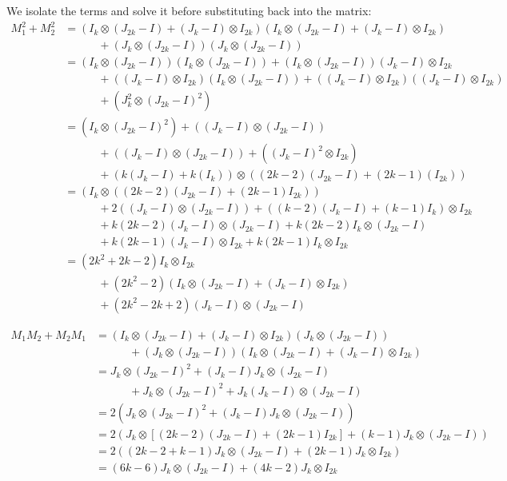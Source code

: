 We isolate the terms and solve it before substituting back into the matrix:
\begin{align*}
    M_1^2+M_2^2
    &= (I_k\otimes (J_{2k}-I) + (J_k-I)\otimes I_{2k})(I_k\otimes (J_{2k}-I) + (J_k-I)\otimes I_{2k})\\
    &\quad\quad\quad + (J_k\otimes (J_{2k}-I))(J_k\otimes (J_{2k}-I))\\
    &= (I_k\otimes (J_{2k}-I))(I_k\otimes (J_{2k}-I)) + (I_k\otimes (J_{2k}-I))(J_k-I)\otimes I_{2k}\\
    &\quad\quad\quad + ((J_k-I)\otimes I_{2k})(I_k\otimes (J_{2k}-I)) + ((J_k-I)\otimes I_{2k})((J_k-I)\otimes I_{2k})\\
    &\quad\quad\quad +(J^2_k\otimes (J_{2k}-I)^2)\\
    &= (I_k\otimes (J_{2k}-I)^2) + ((J_k-I)\otimes(J_{2k}-I))\\
    &\quad\quad\quad + ((J_k-I)\otimes(J_{2k}-I)) + ((J_k-I)^2 \otimes I_{2k})\\
    &\quad\quad\quad+(k(J_k-I)+k(I_k))\otimes ((2k-2)(J_{2k}-I) + (2k-1)(I_{2k}))\\
    &=(I_k\otimes ((2k-2)(J_{2k}-I) + (2k-1)I_{2k}))\\
    &\quad\quad\quad+2((J_k-I)\otimes(J_{2k}-I)) + ((k-2)(J_k-I) + (k-1)I_k)\otimes I_{2k}\\
    &\quad\quad\quad+k(2k-2)(J_k-I)\otimes(J_{2k}-I) + k(2k-2)I_k\otimes(J_{2k}-I) \\
    &\quad\quad\quad +k(2k-1)(J_k-I)\otimes I_{2k} + k(2k-1)I_k\otimes I_{2k}\\
    &= (2k^2+2k-2)I_k\otimes I_{2k}\\
    &\quad\quad\quad +(2k^2-2)(I_k\otimes(J_{2k}-I) + (J_k-I)\otimes I_{2k})\\
    &\quad\quad\quad+(2k^2-2k+2)(J_k-I)\otimes(J_{2k}-I)
\end{align*}

\begin{align*}
     M_1M_2 + M_2M_1
     &= (I_k\otimes (J_{2k}-I) + (J_k-I)\otimes I_{2k})(J_k\otimes (J_{2k}-I)) \\
     &\quad\quad\quad+(J_k\otimes (J_{2k}-I))(I_k\otimes (J_{2k}-I) + (J_k-I)\otimes I_{2k}) \\
     &= J_k\otimes (J_{2k}-I)^2 + (J_k-I)J_k\otimes (J_{2k}-I) \\
     &\quad\quad\quad+J_k\otimes (J_{2k}-I)^2 + J_k(J_k-I)\otimes (J_{2k}-I)\\
     &= 2(J_k\otimes (J_{2k}-I)^2 + (J_k-I)J_k\otimes (J_{2k}-I)) \\
     &=2(J_k\otimes [(2k-2)(J_{2k}-I)+(2k-1)I_{2k}] + (k-1)J_k\otimes (J_{2k}-I))\\
     &=2((2k-2+k-1)J_k\otimes (J_{2k}-I) + (2k-1)J_k\otimes I_{2k})\\
     &= (6k-6)J_k\otimes (J_{2k}-I) + (4k-2)J_k\otimes I_{2k}
\end{align*}

